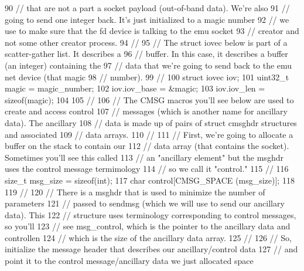 \begin{DoxyCode}
90   \textcolor{comment}{// that are not a part a socket payload (out-of-band data).  We're also}
91   \textcolor{comment}{// going to send one integer back.  It's just initialized to a magic number}
92   \textcolor{comment}{// we use to make sure that the fd device is talking to the emu socket}
93   \textcolor{comment}{// creator and not some other creator process.}
94   \textcolor{comment}{//}
95   \textcolor{comment}{// The struct iovec below is part of a scatter-gather list.  It describes a}
96   \textcolor{comment}{// buffer.  In this case, it describes a buffer (an integer) containing the}
97   \textcolor{comment}{// data that we're going to send back to the emu net device (that magic}
98   \textcolor{comment}{// number).}
99   \textcolor{comment}{//}
100   \textcolor{keyword}{struct }iovec iov;
101   uint32\_t magic = magic\_number;
102   iov.iov\_base = &magic;
103   iov.iov\_len = \textcolor{keyword}{sizeof}(magic);
104 
105   \textcolor{comment}{//}
106   \textcolor{comment}{// The CMSG macros you'll see below are used to create and access control}
107   \textcolor{comment}{// messages (which is another name for ancillary data).  The ancillary}
108   \textcolor{comment}{// data is made up of pairs of struct cmsghdr structures and associated}
109   \textcolor{comment}{// data arrays.}
110   \textcolor{comment}{//}
111   \textcolor{comment}{// First, we're going to allocate a buffer on the stack to contain our}
112   \textcolor{comment}{// data array (that contains the socket).  Sometimes you'll see this called}
113   \textcolor{comment}{// an "ancillary element" but the msghdr uses the control message termimology}
114   \textcolor{comment}{// so we call it "control."}
115   \textcolor{comment}{//}
116   \textcolor{keywordtype}{size\_t} msg\_size = \textcolor{keyword}{sizeof}(int);
117   \textcolor{keywordtype}{char} control[CMSG\_SPACE (msg\_size)];
118 
119   \textcolor{comment}{//}
120   \textcolor{comment}{// There is a msghdr that is used to minimize the number of parameters}
121   \textcolor{comment}{// passed to sendmsg (which we will use to send our ancillary data).  This}
122   \textcolor{comment}{// structure uses terminology corresponding to control messages, so you'll}
123   \textcolor{comment}{// see msg\_control, which is the pointer to the ancillary data and controllen}
124   \textcolor{comment}{// which is the size of the ancillary data array.}
125   \textcolor{comment}{//}
126   \textcolor{comment}{// So, initialize the message header that describes our ancillary/control data}
127   \textcolor{comment}{// and point it to the control message/ancillary data we just allocated space}

\end{DoxyCode}
